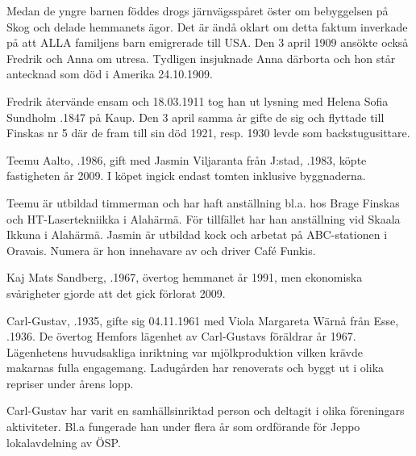 Medan de yngre barnen föddes drogs järnvägsspåret öster om bebyggelsen på Skog och delade hemmanets ägor. Det är ändå oklart om detta faktum inverkade på att ALLA familjens barn emigrerade till USA. Den 3 april 1909 ansökte också Fredrik och Anna om utresa. Tydligen insjuknade Anna därborta och hon står antecknad som död i Amerika 24.10.1909.

Fredrik återvände ensam och 18.03.1911 tog han ut lysning med Helena Sofia Sundholm .1847 på Kaup. Den 3 april samma år gifte de sig och flyttade till Finskas nr 5 där de fram till sin död 1921, resp. 1930 levde som backstugusittare.




Teemu Aalto, .1986, gift med Jasmin Viljaranta från J:stad, .1983, köpte fastigheten år 2009. I köpet ingick endast tomten inklusive byggnaderna.



Teemu är utbildad timmerman och har haft anställning bl.a. hos Brage Finskas och HT-Lasertekniikka i Alahärmä. För tillfället har han anställning vid Skaala Ikkuna i Alahärmä. Jasmin är utbildad kock och arbetat på ABC-stationen i Oravais. Numera är hon innehavare av och driver Café Funkis.
\begin{jhchildren}
  \item {}
  \item {}
  \item {}
\end{jhchildren}



Kaj Mats Sandberg,  .1967, övertog hemmanet år 1991, men ekonomiska svårigheter gjorde att det gick förlorat 2009.



Carl-Gustav, .1935, gifte sig 04.11.1961 med Viola Margareta Wärnå från Esse, .1936. De övertog Hemfors lägenhet av Carl-Gustavs föräldrar år 1967. Lägenhetens huvudsakliga inriktning var mjölkproduktion vilken krävde makarnas fulla engagemang. Ladugården har renoverats och byggt ut i olika repriser under årens lopp.

Carl-Gustav har varit en samhällsinriktad person och deltagit i olika föreningars aktiviteter. Bl.a fungerade han under flera år som
ordförande för Jeppo lokalavdelning av ÖSP.
\begin{jhchildren}
  \item {}
  \item {}
  \item {}
  \item {}
\end{jhchildren}


